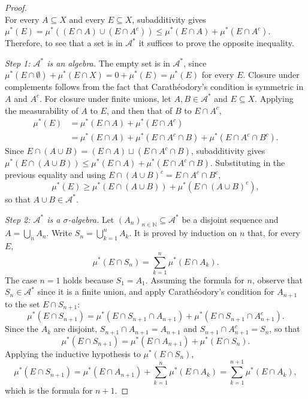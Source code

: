 \documentclass[11pt, a4paper]{article}
\begin{document}
\begin{proof}\leavevmode\\
For every $A \subseteq X$ and every $E \subseteq X$, subadditivity gives $\mu^*(E) = \mu^*((E \cap A) \cup (E \cap A^c)) \le \mu^*(E \cap A) + \mu^*(E \cap A^c)$. Therefore, to see that a set is in $\mathcal{A}^*$ it suffices to prove the opposite inequality.

\textit{Step 1: $\mathcal{A}^*$ is an algebra.} The empty set is in $\mathcal{A}^*$, since $\mu^*(E \cap \emptyset) + \mu^*(E \cap X) = 0 + \mu^*(E) = \mu^*(E)$ for every $E$. Closure under complements follows from the fact that Carathéodory's condition is symmetric in $A$ and $A^c$. For closure under finite unions, let $A, B \in \mathcal{A}^*$ and $E \subseteq X$. Applying the measurability of $A$ to $E$, and then that of $B$ to $E \cap A^c$,
\begin{align*}
\mu^*(E) &= \mu^*(E \cap A) + \mu^*(E \cap A^c) \\
&= \mu^*(E \cap A) + \mu^*(E \cap A^c \cap B) + \mu^*(E \cap A^c \cap B^c).
\end{align*}
Since $E \cap (A \cup B) = (E \cap A) \sqcup (E \cap A^c \cap B)$, subadditivity gives $\mu^*(E \cap (A \cup B)) \le \mu^*(E \cap A) + \mu^*(E \cap A^c \cap B)$. Substituting in the previous equality and using $E \cap (A \cup B)^c = E \cap A^c \cap B^c$,
$$ \mu^*(E) \ge \mu^*(E \cap (A \cup B)) + \mu^*(E \cap (A \cup B)^c), $$
so that $A \cup B \in \mathcal{A}^*$.

\textit{Step 2: $\mathcal{A}^*$ is a $\sigma$-algebra.} Let $(A_n)_{n \in \mathbb{N}} \subseteq \mathcal{A}^*$ be a disjoint sequence and $A = \bigcup_n A_n$. Write $S_n = \bigcup_{k=1}^n A_k$. It is proved by induction on $n$ that, for every $E$,
$$ \mu^*(E \cap S_n) = \sum_{k=1}^n \mu^*(E \cap A_k). $$
The case $n = 1$ holds because $S_1 = A_1$. Assuming the formula for $n$, observe that $S_n \in \mathcal{A}^*$ since it is a finite union, and apply Carathéodory's condition for $A_{n+1}$ to the set $E \cap S_{n+1}$:
$$ \mu^*(E \cap S_{n+1}) = \mu^*(E \cap S_{n+1} \cap A_{n+1}) + \mu^*(E \cap S_{n+1} \cap A_{n+1}^c). $$
Since the $A_k$ are disjoint, $S_{n+1} \cap A_{n+1} = A_{n+1}$ and $S_{n+1} \cap A_{n+1}^c = S_n$, so that
$$ \mu^*(E \cap S_{n+1}) = \mu^*(E \cap A_{n+1}) + \mu^*(E \cap S_n). $$
Applying the inductive hypothesis to $\mu^*(E \cap S_n)$,
$$ \mu^*(E \cap S_{n+1}) = \mu^*(E \cap A_{n+1}) + \sum_{k=1}^n \mu^*(E \cap A_k) = \sum_{k=1}^{n+1} \mu^*(E \cap A_k), $$
which is the formula for $n+1$.


\end{proof}
\end{document}
